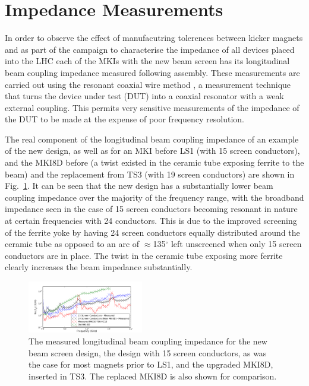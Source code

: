 \documentclass[a4paper,
              ]{jacow}
\begin{document}
\section{Impedance Measurements}

In order to observe the effect of manufacutring tolerences between kicker magnets and as part of the campaign to characterise the impedance of all devices placed into the LHC each of the MKIs with the new beam screen has its longitudinal beam coupling impedance measured following assembly. These measurements are carried out using the resonant coaxial wire method \cite{DayThesis}, a measurement technique that turns the device under test (DUT) into a coaxial resonator with a weak external coupling. This permits very sensitive measurements of the impedance of the DUT to be made at the expense of poor frequency resolution.

The real component of the longitudinal beam coupling impedance of an example of the new design, as well as for an MKI before LS1 (with 15 screen conductors), and the MKI8D before (a twist existed in the ceramic tube exposing ferrite to the beam) and the replacement from TS3 (with 19 screen conductors) are shown in Fig.~\ref{fig:Imp241915}. It can be seen that the new design has a substantially lower beam coupling impedance over the majority of the frequency range, with the broadband impedance seen in the case of 15 screen conductors becoming resonant in nature at certain frequencies with 24 conductors. This is due to the improved screening of the ferrite yoke by having 24 screen conductors equally distributed around the ceramic tube as opposed to an arc of $\approx$135$^{\circ}$ left unscreened when only 15 screen conductors are in place. The twist in the ceramic tube exposing more ferrite clearly increases the beam impedance substantially.

\begin{figure}
\includegraphics[width=0.45\textwidth]{measImp151924.pdf}
\caption{The measured longitudinal beam coupling impedance for the new beam screen design, the design with 15 screen conductors, as was the case for most magnets prior to LS1, and the upgraded MKI8D, inserted in TS3. The replaced MKI8D is also shown for comparison.}
\label{fig:Imp241915}
\end{figure}
\end{document}
